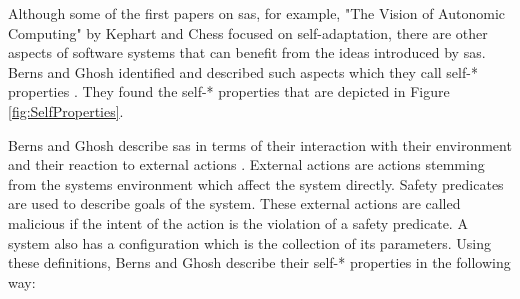 \noindent Although some of the first papers on \acrshort{sas}, for example, 
"The Vision of Autonomic Computing" by Kephart and Chess \cite*{VisionOfAutonomicComputing} focused on self-adaptation,
there are other aspects of software systems that can benefit from the ideas introduced by \acrshort{sas}.
Berns and Ghosh identified and described such aspects which they call self-* properties \cite*{DissectingSelfProperties}.
They found the self-* properties that are depicted in Figure \ref{fig:SelfProperties}.

\noindent Berns and Ghosh describe \acrshort{sas} in terms of their interaction with their environment
and their reaction to external actions \cite*{DissectingSelfProperties}.
External actions are actions stemming from the systems environment which affect the system directly.
Safety predicates are used to describe goals of the system.
These external actions are called malicious if the intent of the action is the violation of a safety predicate.
A system also has a configuration which is the collection of its parameters.
Using these definitions, Berns and Ghosh describe their self-* properties in the following way:

